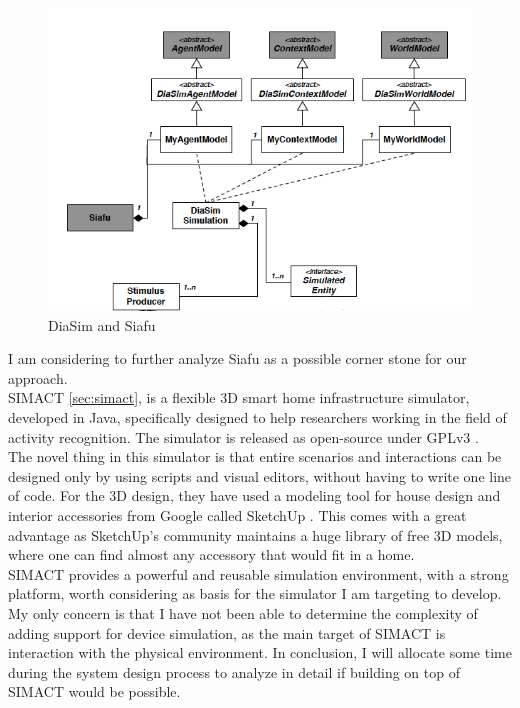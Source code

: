 \begin{figure}[H]
	\centering
	\includegraphics[width=\linewidth]{gfx/Chapter2/diasim_and_siafu}
	\caption{DiaSim and Siafu}
	\label{fig:diasim_and_siafu}
\end{figure}

I am considering to further analyze Siafu as a possible corner stone for our approach.\\

SIMACT \ref{sec:simact}, is a flexible 3D smart home infrastructure simulator, developed in Java, specifically designed to help researchers working in the field of activity recognition. The simulator is released as open-source \cite{bouchard:simact:Online} under GPLv3 \cite{gpl:v3}.\\

The novel thing in this simulator is that entire scenarios and interactions can be designed only by using scripts and visual editors, without having to write one line of code. For the 3D design, they have used a modeling tool for house design and interior accessories from Google called SketchUp \cite{sketchup:online}. This comes with a great advantage as SketchUp's community maintains a huge library of free 3D models, where one can find almost any accessory that would fit in a home.\\

SIMACT provides a powerful and reusable simulation environment, with a strong platform, worth considering as basis for the simulator I am targeting to develop. My only concern is that I have not been able to determine the complexity of adding support for device simulation, as the main target of SIMACT is interaction with the physical environment. In conclusion, I will allocate some time during the system design process to analyze in detail if building on top of SIMACT would be possible.\\


